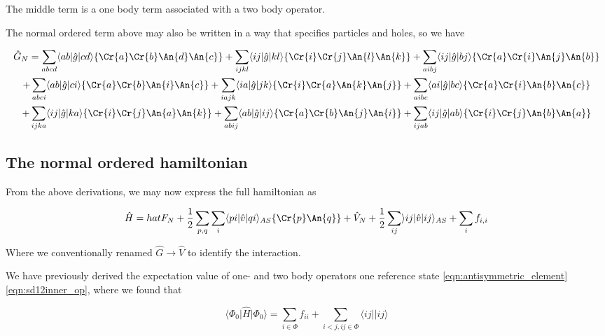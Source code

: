 The middle term is a one body term associated with a two body operator.  \cite{ShavittBartlett2009}

The normal ordered term above may also be written in a way that specifies particles and holes, so we have

\begin{multline}
\hat{G}_N = \sum_{abcd} \langle ab\vert \hat{g} \vert cd \rangle \{ \Cr{a} \Cr{b} \An{d} \An{c} \}
+  \sum_{ijkl} \langle ij\vert \hat{g} \vert kl \rangle \{ \Cr{i} \Cr{j} \An{l} \An{k} \}
+  \sum_{aibj} \langle ij\vert \hat{g} \vert bj \rangle \{ \Cr{a} \Cr{i} \An{j} \An{b} \} \\
+  \sum_{abci} \langle ab \vert \hat{g} \vert ci \rangle \{ \Cr{a} \Cr{b} \An{i} \An{c} \}
+  \sum_{iajk} \langle ia\vert \hat{g} \vert jk \rangle \{ \Cr{i} \Cr{a} \An{k} \An{j} \}
+  \sum_{aibc} \langle ai\vert \hat{g} \vert bc \rangle \{ \Cr{a} \Cr{i} \An{b} \An{c} \} \\
+  \sum_{ijka} \langle ij \vert \hat{g} \vert ka \rangle \{ \Cr{i} \Cr{j} \An{a} \An{k} \}
+  \sum_{abij} \langle ab\vert \hat{g} \vert ij \rangle \{ \Cr{a} \Cr{b} \An{j} \An{i} \}
+  \sum_{ijab} \langle ij\vert \hat{g} \vert ab \rangle \{ \Cr{i} \Cr{j} \An{b} \An{a} \}
\label{eqn:twobody_NN}
\end{multline}

\subsection{The normal ordered hamiltonian}

From the above derivations, we may now express the full hamiltonian as

\begin{multline}
\hat{H} = hat{F}_N + \frac{1}{2} \sum_{p,q}  \sum_i \langle pi \vert \hat{v} \vert qi \rangle_{AS} \{\Cr{p} \An{q} \} + \hat{V}_N + \frac{1}{2} \sum_{ij} \rangle ij \vert \hat{v} \vert ij \rangle_{AS} +  \sum_{i} f_{i,i} 
\label{eqn:hamiltonian_full}
\end{multline}

Where we conventionally renamed $\hat{G} \rightarrow \hat{V}$ to identify the interaction. 

We have previously derived the expectation value of one- and two body operators one reference state \ref{eqn:antisymmetric_element} \ref{eqn:sd12inner_op}, where we found that

\begin{equation}
\langle \Phi_0 \vert  \hat{H} \vert \Phi_0 \rangle = \sum_{i \in \Phi} f_{ii} + \sum_{i < j, ij \in \Phi}  \langle ij \vert \vert ij \rangle
\label{eqn:hamiltonian1}
\end{equation}


